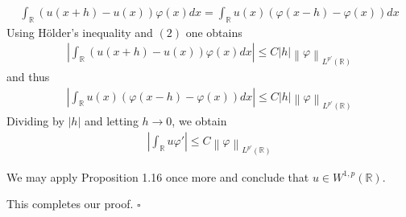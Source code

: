 \documentclass[a4paper,oneside]{article}
\numberwithin{equation}{section}
\begin{document}
\begin{enumerate}
\begin{align}
\int_{\mathbb{R}} {\left( {u\left( {x + h} \right) - u\left( x \right)} \right)\varphi \left( x \right)dx}  = \int_{\mathbb{R}} {u\left( x \right)\left( {\varphi \left( {x - h} \right) - \varphi \left( x \right)} \right)dx} 
\end{align}
Using H\"{o}lder's inequality and $\left(2\right)$ one obtains
\begin{align}
\left| {\int_{\mathbb{R}} {\left( {u\left( {x + h} \right) - u\left( x \right)} \right)\varphi \left( x \right)dx} } \right| \le C\left| h \right|{\left\| \varphi  \right\|_{{L^{p'}}\left( {\mathbb{R}} \right)}}
\end{align}
and thus
\begin{align}
\left| {\int_{\mathbb{R}} {u\left( x \right)\left( {\varphi \left( {x - h} \right) - \varphi \left( x \right)} \right)dx} } \right| \le C\left| h \right|{\left\| \varphi  \right\|_{{L^{p'}}\left( {\mathbb{R}} \right)}}
\end{align}
Dividing by $\left| h \right|$ and letting $h\to 0$, we obtain
\begin{align}
\left| {\int_{\mathbb{R}} {u\varphi '} } \right| \le C{\left\| \varphi  \right\|_{{L^{p'}}\left({\mathbb{R}}  \right)}}
\end{align}

We may apply Proposition 1.16 once more and conclude that $u \in W^{1,p}\left(\mathbb{R}\right)$. 
\end{enumerate}
This completes our proof. \hfill $\square$\\
\end{document}
